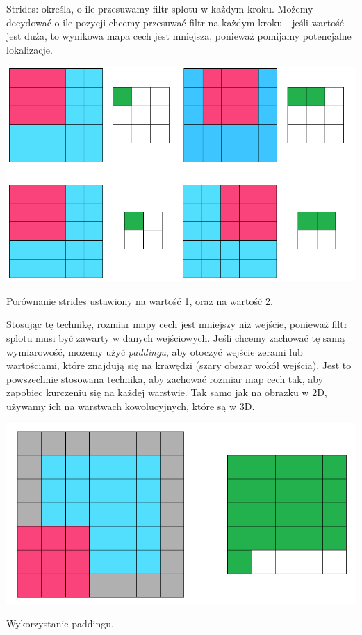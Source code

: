 \documentclass[12pt,a4paper]{article}
\begin{document}
    Strides: określa, o ile przesuwamy filtr splotu w każdym kroku. Możemy decydować o ile pozycji chcemy przesuwać filtr na każdym kroku - jeśli wartość jest duża, to wynikowa mapa cech jest mniejsza, ponieważ pomijamy potencjalne lokalizacje.
    \begin{center}
        \includegraphics[scale=0.55]{stride_comparison.png}
        \begin{flushright}
            \begin{scriptsize}
            Porównanie strides ustawiony na wartość 1, oraz na wartość 2.
            \end{scriptsize}
        \end{flushright}
    \end{center}
    
    Stosując tę technikę, rozmiar mapy cech jest mniejszy niż wejście, ponieważ filtr splotu musi być zawarty w danych wejściowych. Jeśli chcemy zachować tę samą wymiarowość, możemy użyć \textit{paddingu}, aby otoczyć wejście zerami lub wartościami, które znajdują się na krawędzi (szary obszar wokół wejścia). Jest to powszechnie stosowana technika, aby zachować rozmiar map cech tak, aby zapobiec kurczeniu się na każdej warstwie. Tak samo jak na obrazku w 2D, używamy ich na warstwach kowolucyjnych, które są w 3D.
    \begin{center}
        \includegraphics[scale=0.55]{padding.png}
        \begin{flushright}
            \begin{scriptsize}
            Wykorzystanie paddingu.
            \end{scriptsize}
        \end{flushright}
    \end{center}
    
\end{document}

